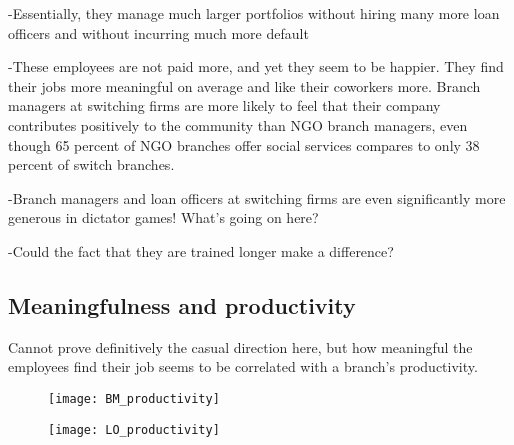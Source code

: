 \documentclass[11pt]{article}
\begin{document}
-Essentially, they manage much larger portfolios without hiring many more loan officers and without incurring much more default

-These employees are not paid more, and yet they seem to be happier. They find their jobs more meaningful on average and like their coworkers more. Branch managers at switching firms are more likely to feel that their company contributes positively to the community than NGO branch managers, even though 65 percent of NGO branches offer social services compares to only 38 percent of switch branches. 

-Branch managers and loan officers at switching firms are even significantly more generous in dictator games! What's going on here?

-Could the fact that they are trained longer make a difference?

\FloatBarrier

\subsection{Meaningfulness and productivity}

Cannot prove definitively the casual direction here, but how meaningful the employees find their job seems to be correlated with a branch's productivity.

\begin{figure} [!h]
\centering
\texttt{[image: BM\_productivity]}
\end{figure}

\begin{figure} [!h]
\centering
\texttt{[image: LO\_productivity]}
\end{figure}

\pagebreak
\end{document}

